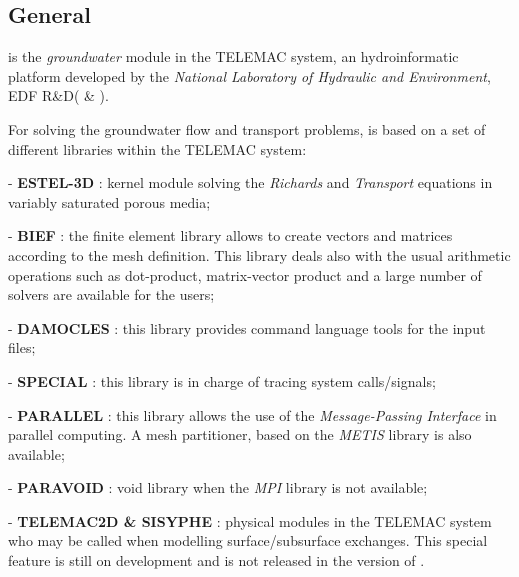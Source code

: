 \subsection{General}
\estel is the \textit{groundwater} module in the TELEMAC system,
an hydroinformatic platform developed by the \textit{National Laboratory of Hydraulic and Environment}, EDF R\&D(\cite{JMH1} \&  \cite{JMH2}).

\vspace*{5pt}

For solving the groundwater flow and transport problems,
\estel is based on a set of different libraries within the TELEMAC system:
% 
\begin{list}{-}{}
\item[-] \textbf{ESTEL-3D} : kernel module solving the \textit{Richards} and \textit{Transport} equations in variably saturated porous media;
\item[-] \textbf{BIEF} : the finite element library allows \estel to create vectors and matrices according to the mesh definition.
This library deals also with the usual arithmetic operations such as dot-product, matrix-vector product and a large number of solvers are available for the users;
\item[-] \textbf{DAMOCLES} : this library provides command language tools for the \estel input files;
\item[-] \textbf{SPECIAL} : this library is in charge of tracing system calls/signals;
\item[-] \textbf{PARALLEL} : this library allows the use of the \textit{Message-Passing Interface} in parallel computing.
A mesh partitioner, based on the \textit{METIS} library is also available;
\item[-] \textbf{PARAVOID} : void library when the \textit{MPI} library is not available;
\item[-] \textbf{TELEMAC2D \& SISYPHE} : physical modules in the TELEMAC system who may be called when modelling surface/subsurface exchanges.
This special feature is still on development and is not released in the \rel version of \estel.
\end{list}

